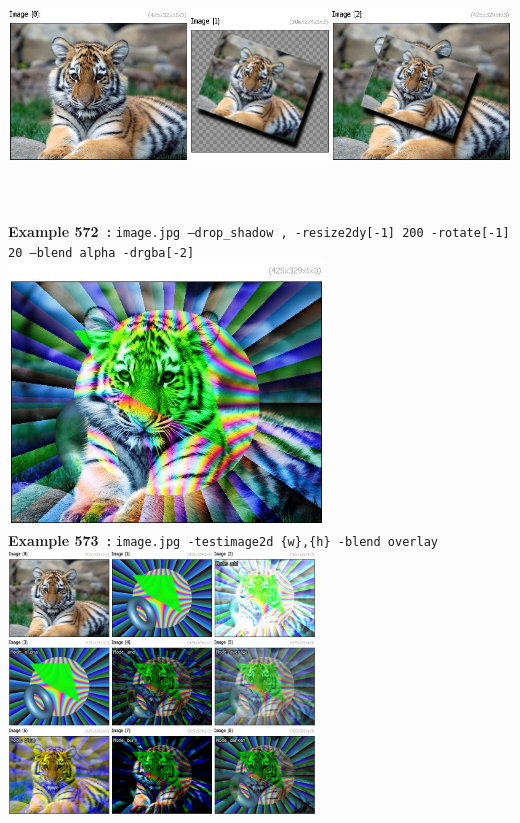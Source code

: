 \documentclass[a4paper,11pt,twoside]{book}
\begin{document}
\begin{center}\includegraphics[keepaspectratio=true,height=7cm,width=\textwidth]{img/gmic_def572.jpg}\\
{\footnotesize \textbf{Example 572~:} \texttt{image.jpg --drop\_shadow , -resize2dy[-1] 200 -rotate[-1] 20 --blend alpha -drgba[-2]}}
\\\includegraphics[keepaspectratio=true,height=7cm,width=\textwidth]{img/gmic_def573.jpg}\\
{\footnotesize \textbf{Example 573~:} \texttt{image.jpg -testimage2d \{w\},\{h\} -blend overlay}}
\\\includegraphics[keepaspectratio=true,height=7cm,width=\textwidth]{img/gmic_def574.jpg}\\

\end{center}
\end{document}
